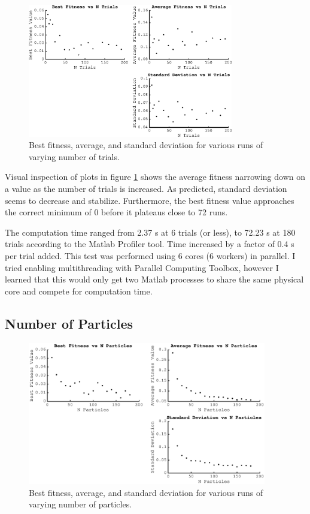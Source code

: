 \documentclass{article}
\begin{document}
\begin{figure}[h!]
\centering
\includegraphics[width=0.8\textwidth]{trials_fig1}
\caption{Best fitness, average, and standard deviation for various runs of varying number of trials.}
\label{fig:trials_1}
\end{figure}

Visual inspection of plots in figure \ref{fig:trials_1} shows the average fitness narrowing down on a value as the number of trials is increased.
As predicted, standard deviation seems to decrease and stabilize.
Furthermore, the best fitness value approaches the correct minimum of 0 before it plateaus close to 72 runs.

The computation time ranged from 2.37 s at 6 trials (or less), to 72.23 s at 180 trials according to the Matlab Profiler tool.
Time increased by a factor of 0.4 s per trial added.
This test was performed using 6 cores (6 workers) in parallel.
I tried enabling multithreading with Parallel Computing Toolbox, however I learned that this would only get two Matlab processes to share the same physical core and compete for computation time.

\subsection{Number of Particles}

\begin{figure}[h!]
\centering
\includegraphics[width=0.93\textwidth]{particle_2d}
\caption{Best fitness, average, and standard deviation for various runs of varying number of particles.}
\label{fig:particle_2d}
\end{figure}
\end{document}
